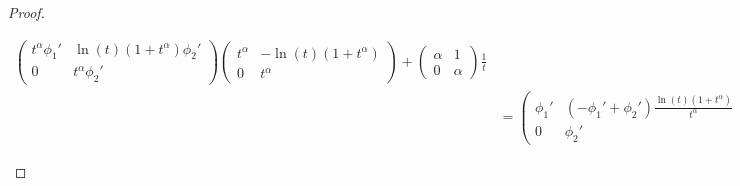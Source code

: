 \begin{proof}
\begin{enumerate}
\begin{align*}
\begin{pmatrix}
          t^\alpha \phi_1' & \ln(t)(1+t^\alpha)\phi_2'
          \\0 & t^\alpha \phi_2'
        \end{pmatrix} 
        \begin{pmatrix}
          t^\alpha & -\ln(t)(1+t^\alpha)
          \\ 0 & t^\alpha
        \end{pmatrix}
        +
        \begin{pmatrix} \alpha & 1 \\ 0 & \alpha \end{pmatrix} \frac{1}{t}
        \\&= \begin{pmatrix}
          \phi_1' & (-\phi_1'+\phi_2')\frac{\ln(t)(1+t^\alpha)}{t^\alpha}
          \\0 & \phi_2'
        \end{pmatrix} 
        +
        \begin{pmatrix} \alpha & 1 \\ 0 & \alpha \end{pmatrix} \frac{1}{t}
      \end{align*}
  \end{enumerate}
\end{proof}
